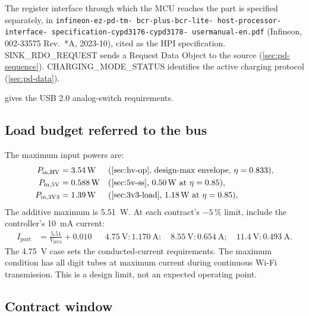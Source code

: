 {\sloppy
The register interface through which the MCU reaches the part is specified
separately, in
\texttt{infineon-\allowbreak ez-\allowbreak pd-\allowbreak tm-\allowbreak
bcr-\allowbreak plus-\allowbreak bcr-\allowbreak lite-\allowbreak
host-\allowbreak processor-\allowbreak interface-\allowbreak
specification-\allowbreak cypd3176-\allowbreak cypd3178-\allowbreak
usermanual-\allowbreak en.pdf}
(Infineon, 002-33575 Rev.~*A, 2023-10), cited as the HPI specification.
SINK\_RDO\_REQUEST sends a Request Data Object to the source
(\cref{sec:pd-sequence}). CHARGING\_MODE\_STATUS identifies the active charging
protocol (\cref{sec:pd-data}).
\par}

 gives the USB 2.0 analog-switch requirements.

\subsection{Load budget referred to the bus}\label{sec:pd-load}

The maximum input powers are:
\begin{align*}
  P_{\mathrm{in,HV}} &= \SI{3.54}{\watt} && \text{(\cref{sec:hv-op}, design-max envelope, } \eta = 0.833), \\
  P_{\mathrm{in,5V}} &= \SI{0.588}{\watt} && \text{(\cref{sec:5v-ss}, \SI{0.50}{\watt} at } \eta = 0.85), \\
  P_{\mathrm{in,3V3}} &= \SI{1.39}{\watt} && \text{(\cref{sec:3v3-load}, \SI{1.18}{\watt} at } \eta = 0.85),
\end{align*}
The additive maximum is \SI{5.51}{\watt}. At each contract's $-5\,\%$ limit,
include the controller's \SI{10}{\milli\ampere} current:
\begin{align*}
  I_{\mathrm{port}} &= \frac{5.51}{V_{\mathrm{BUS}}} + 0.010
  &&\SI{4.75}{\volt}: \SI{1.170}{\ampere}; \quad
    \SI{8.55}{\volt}: \SI{0.654}{\ampere}; \quad
    \SI{11.4}{\volt}: \SI{0.493}{\ampere}.
\end{align*}
The \SI{4.75}{\volt} case sets the conducted-current requirements. The maximum
condition has all digit tubes at maximum current during continuous Wi-Fi
transmission. This is a design limit, not an expected operating point.

\subsection{Contract window}\label{sec:pd-window}

